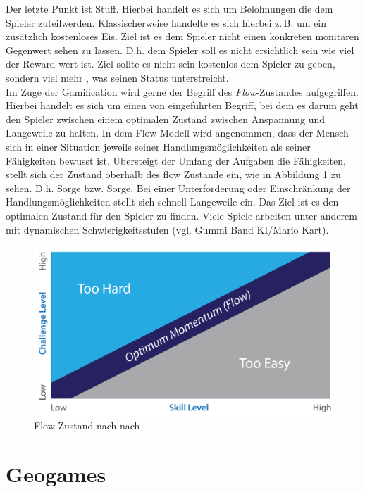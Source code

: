 Der letzte Punkt ist Stuff. Hierbei handelt es sich um Belohnungen die dem Spieler zuteilwerden. Klassischerweise handelte es sich hierbei z.\,B. um ein zusätzlich kostenloses Eis. Ziel ist es dem Spieler nicht einen konkreten monitären Gegenwert sehen zu lassen. D.h. dem Spieler soll es nicht ersichtlich sein wie viel der Reward wert ist. Ziel sollte es nicht sein kostenlos dem Spieler zu geben, sondern viel mehr , was seinen Status unterstreicht.\\

Im Zuge der Gamification wird gerne der Begriff des \textit{Flow}-Zustandes aufgegriffen.
Hierbei handelt es sich um einen von \cite{Csikszentmihalyi.1991} eingeführten Begriff, bei dem es darum geht den Spieler zwischen einem optimalen Zustand zwischen Anspannung und Langeweile zu halten. In dem Flow Modell wird angenommen, dass der Mensch sich in einer Situation jeweils seiner Handlungsmöglichkeiten als seiner Fähigkeiten bewusst ist.
Übersteigt der Umfang der Aufgaben die Fähigkeiten, stellt sich der Zustand oberhalb des flow Zustande ein, wie in Abbildung \ref{img:ch03_img02_flow} zu sehen. D.h. Sorge bzw. Sorge. Bei einer Unterforderung oder Einschränkung der Handlungsmöglichkeiten stellt sich schnell Langeweile ein. Das Ziel ist es den optimalen Zustand für den Spieler zu finden. Viele Spiele arbeiten unter anderem mit dynamischen Schwierigkeitsstufen (vgl. Gummi Band KI/Mario Kart).

\begin{figure}[H]
\begin{center}
\includegraphics[width=120mm]{images/ch03_img02_flow.png}
\caption{Flow Zustand nach nach \textcite{Csikszentmihalyi.1991}}
\label{img:ch03_img02_flow}
\end{center}
\end{figure}

\section{Geogames}
\label{ch3:s:Geogames}

